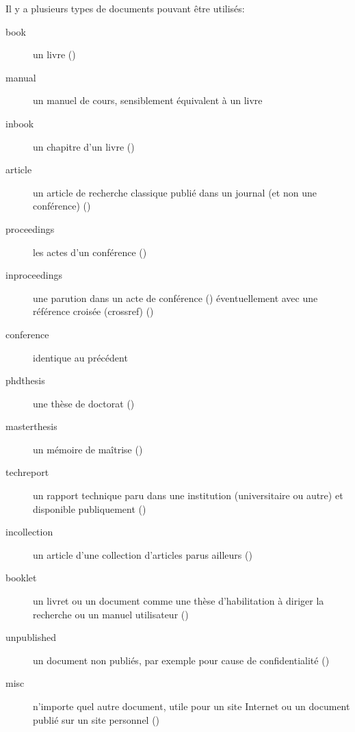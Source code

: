 Il y a plusieurs types de documents pouvant \^etre utilis\'es:
\begin{description}
\item[book] un livre (\cite{Abr.96-BBook,Hoa.85-CSP,Jac.83-JSD,Mil.89-CCS})
\item[manual] un manuel de cours, sensiblement \'equivalent \`a un livre
\item[inbook] un chapitre d'un livre (\cite{Ch.96-Programmer-avec-Scheme})
\item[article] un article de recherche classique publi\'e dans un journal (et non une conf\'erence) (\cite{Bo.84-VVS,FFL.05-SOSYM,FSd.03-eb3})
\item[proceedings] les actes d'un conf\'erence (\cite{LeWe.09-IFM,ArGnMa.03-FME}) 
\item[inproceedings] une parution dans un acte de conf\'erence (\cite{Matra.99-Meteor,FF.07-ICFEM,Pn.79-The-Temporal-Semantics-of-Concurrent-Programs}) \'eventuellement avec une r\'ef\'erence crois\'ee  (crossref) (\cite{LeBu.03-ProB})
\item[conference] identique au pr\'ec\'edent
\item[phdthesis] une th\`ese de doctorat (\cite{FRA.06-thesis})
\item[masterthesis] un m\'emoire de ma\^itrise (\cite{Ri.01-EB3})
\item[techreport] un rapport technique paru dans une institution (universitaire ou autre) et disponible publiquement (\cite{FRA.05-TR9})
\item[incollection] un article d'une collection d'articles parus ailleurs (\cite{BB.89-LOTOS}) 
\item[booklet] un livret ou un document comme une th\`ese d'habilitation \`a diriger la recherche ou un manuel utilisateur (\cite{La.02-CDBD,STE.97-Manuel-B})
\item[unpublished] un document non publi\'es, par exemple pour cause de confidentialit\'e (\cite{BuDo.99-guide-B})
\item[misc] n'importe quel autre document, utile pour un site Internet ou un document publi\'e sur un site personnel (\cite{INRIA.cadp,Gi.08-Logic-Vs.-Intelligence})
\end{description}